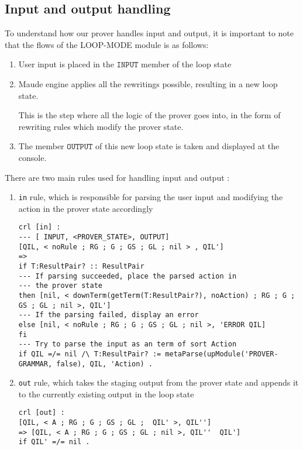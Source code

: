 \documentclass[12pt,a4paper]{article}
\begin{document}
\subsection{Input and output handling}
To understand how our prover handles input and output, it is important to note that the flows of the LOOP-MODE module is as follows: 
\begin{enumerate}
	\item User input is placed in the \(\mathtt{INPUT}\) member of the loop state
	\item Maude engine applies all the rewritings possible, resulting in a new loop state. 
	
	This is the step where all the logic of the prover goes into, in the form of rewriting rules which modify the prover state.
	\item The member \(\mathtt{OUTPUT}\) of this new loop state is taken and displayed at the console.
\end{enumerate}
There are two main rules used for handling input and output : 
\begin{enumerate}
	\item{\texttt{in} rule, which is responsible for parsing the user input and modifying the action in the prover state accordingly}
	\begin{lstlisting}[caption=in rule]
crl [in] : 
--- [ INPUT, <PROVER_STATE>, OUTPUT]
[QIL, < noRule ; RG ; G ; GS ; GL ; nil > , QIL']
=> 
if T:ResultPair? :: ResultPair  
--- If parsing succeeded, place the parsed action in
--- the prover state
then [nil, < downTerm(getTerm(T:ResultPair?), noAction) ; RG ; G ; GS ; GL ; nil >, QIL']  
--- If the parsing failed, display an error
else [nil, < noRule ; RG ; G ; GS ; GL ; nil >, 'ERROR QIL]  
fi  
--- Try to parse the input as an term of sort Action
if QIL =/= nil /\ T:ResultPair? := metaParse(upModule('PROVER-GRAMMAR, false), QIL, 'Action) .
\end{lstlisting}
	\item{\texttt{out} rule, which takes the staging output from the prover state and appends it to the currently existing output in the loop state}
	\begin{lstlisting}[caption=out rule]
crl [out] :
[QIL, < A ; RG ; G ; GS ; GL ;  QIL' >, QIL'']
=> [QIL, < A ; RG ; G ; GS ; GL ; nil >, QIL''  QIL']
if QIL' =/= nil .
\end{lstlisting}
\end{enumerate}
\end{document}
